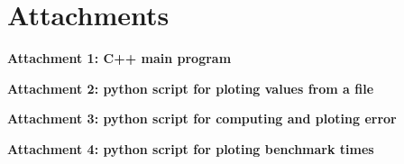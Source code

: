 \documentclass[norsk,a4paper,12pt]{article}
\begin{document}
\newpage

\section*{Attachments}

\textbf{Attachment 1: C++ main program}\newline


\newpage

\textbf{Attachment 2: python script for ploting values from a file}\newline


\newpage
\textbf{Attachment 3: python script for computing and ploting error}\newline


\newpage
\textbf{Attachment 4: python script for ploting benchmark times}\newline




\end{document}
